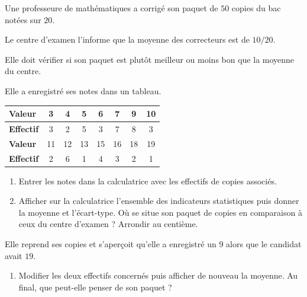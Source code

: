 \begin{exo}
	Une professeure de mathématiques a corrigé son paquet de $50$ copies du bac notées sur $20$.

	Le centre d'examen l'informe que la moyenne des correcteurs est de $10/20$.

	Elle doit vérifier si son paquet est plutôt meilleur ou moins bon que la moyenne du centre.

	Elle a enregistré ses notes dans un tableau.

	\begin{center}
		\def\arraystretch{1.5}
		\small
		\begin{tabular}{|l|c|c|c|c|c|c|c|}
			\hline
			\textbf{Valeur}   & 3  & 4  & 5  & 6  & 7  & 9  & 10 \\ \hline
			\textbf{Effectif} & 3  & 2  & 5  & 3  & 7  & 8  & 3  \\ \hline\hline
			\textbf{Valeur}   & 11 & 12 & 13 & 15 & 16 & 18 & 19 \\ \hline
			\textbf{Effectif} & 2  & 6  & 1  & 4  & 3  & 2  & 1  \\ \hline
		\end{tabular}
	\end{center}

	\begin{enumerate}
		\item Entrer les notes dans la calculatrice avec les effectifs de copies associés.
		\item Afficher sur la calculatrice l'ensemble des indicateurs statistiques puis donner la moyenne et l'écart-type. Où se situe son paquet de copies en comparaison à ceux du centre d'examen ? Arrondir au centième.
	\end{enumerate}
	
	Elle reprend ses copies et s'aperçoit qu'elle a enregistré un $9$ alors que le candidat avait $19$.

	\begin{enumerate}[resume]
		\item Modifier les deux effectifs concernés puis afficher de nouveau la moyenne. Au final, que peut-elle penser de son paquet ?
	\end{enumerate}
\end{exo}
